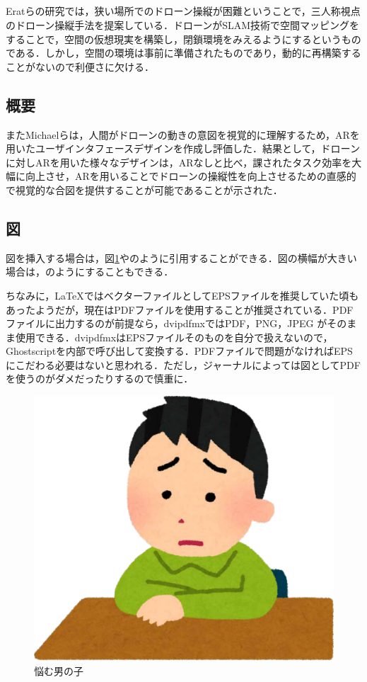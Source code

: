 \documentclass[a4paper,10pt,twocolumn,uplatex]{jsarticle}
\begin{document}
\subsection{}
Eratらの研究では\cite{drone}，狭い場所でのドローン操縦が困難ということで，三人称視点のドローン操縦手法を提案している．ドローンがSLAM技術で空間マッピングをすることで，空間の仮想現実を構築し，閉鎖環境をみえるようにするというものである．しかし，空間の環境は事前に準備されたものであり，動的に再構築することがないので利便さに欠ける．
\subsection{概要}
またMichaelらは\cite{interface}，人間がドローンの動きの意図を視覚的に理解するため，ARを用いたユーザインタフェースデザインを作成し評価した．結果として，ドローンに対しARを用いた様々なデザインは，ARなしと比べ，課されたタスク効率を大幅に向上させ，ARを用いることでドローンの操縦性を向上させるための直感的で視覚的な合図を提供することが可能であることが示された．

\subsection{図}
図を挿入する場合は，図\ref{fig:sample1}やのように引用することができる．図の横幅が大きい場合は，のようにすることもできる．\par
ちなみに，\LaTeX{}ではベクターファイルとしてEPSファイルを推奨していた頃もあったようだが，現在はPDFファイルを使用することが推奨されている．PDFファイルに出力するのが前提なら，dvipdfmxではPDF，PNG，JPEG がそのまま使用できる．dvipdfmxはEPSファイルそのものを自分で扱えないので，Ghostscriptを内部で呼び出して変換する．PDFファイルで問題がなければEPSにこだわる必要はないと思われる．ただし，ジャーナルによっては図としてPDFを使うのがダメだったりするので慎重に．

\begin{figure}[!tb]
  \centering
  \includegraphics[width=\linewidth]{img/sample1.pdf}
  \caption{悩む男の子}
  \label{fig:sample1}
\end{figure}
\end{document}
